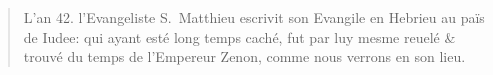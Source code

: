 \begin{quotation}
L'an 42. l'Evangeliste S.~Matthieu escrivit son Evangile en Hebrieu au païs de Iudee: qui ayant esté long temps caché, fut par luy mesme reuelé \& trouvé du temps de l'Empereur Zenon, comme nous verrons en son lieu.
\end{quotation}